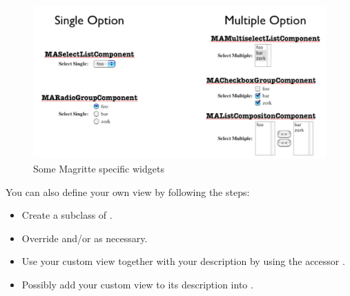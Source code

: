 \documentclass[a4paper,10pt,twoside]{book}
\begin{document}
\begin{figure}
\begin{center}
\includegraphics[width=\linewidth]{views}
\caption{Some Magritte specific widgets\label{custom}}
\end{center}
\end{figure}

You can also define your own view by following the steps: 
\begin{itemize}
\item Create a subclass of .
\item Override  and/or  as necessary.
\item Use your custom view together with your description by using the accessor .
\item Possibly add your custom view to its description into . 
\end{itemize}
\end{document}
